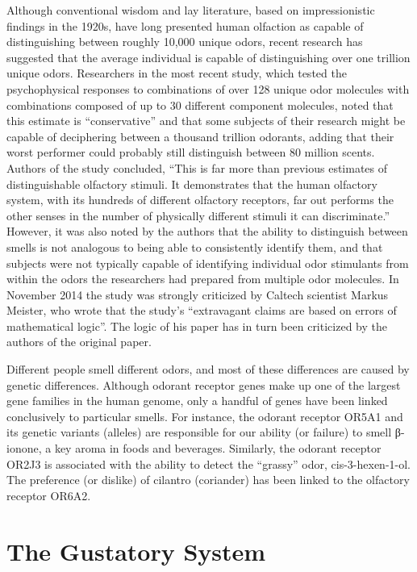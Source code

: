 \documentclass[]{book}
\begin{document}
Although conventional wisdom and lay literature, based on impressionistic findings in the 1920s, have long presented human olfaction as capable of distinguishing between roughly 10,000 unique odors, recent research has suggested that the average individual is capable of distinguishing over one trillion unique odors. Researchers in the most recent study, which tested the psychophysical responses to combinations of over 128 unique odor molecules with combinations composed of up to 30 different component molecules, noted that this estimate is ``conservative'' and that some subjects of their research might be capable of deciphering between a thousand trillion odorants, adding that their worst performer could probably still distinguish between 80 million scents. Authors of the study concluded, ``This is far more than previous estimates of distinguishable olfactory stimuli. It demonstrates that the human olfactory system, with its hundreds of different olfactory receptors, far out performs the other senses in the number of physically different stimuli it can discriminate.'' However, it was also noted by the authors that the ability to distinguish between smells is not analogous to being able to consistently identify them, and that subjects were not typically capable of identifying individual odor stimulants from within the odors the researchers had prepared from multiple odor molecules. In November 2014 the study was strongly criticized by Caltech scientist Markus Meister, who wrote that the study's ``extravagant claims are based on errors of mathematical logic''. The logic of his paper has in turn been criticized by the authors of the original paper.

Different people smell different odors, and most of these differences are caused by genetic differences. Although odorant receptor genes make up one of the largest gene families in the human genome, only a handful of genes have been linked conclusively to particular smells. For instance, the odorant receptor OR5A1 and its genetic variants (alleles) are responsible for our ability (or failure) to smell β-ionone, a key aroma in foods and beverages. Similarly, the odorant receptor OR2J3 is associated with the ability to detect the ``grassy'' odor, cis-3-hexen-1-ol. The preference (or dislike) of cilantro (coriander) has been linked to the olfactory receptor OR6A2.

\hypertarget{the-gustatory-system}{%
\chapter{The Gustatory System}\label{the-gustatory-system}}
\end{document}
